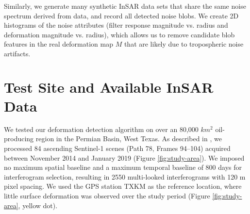 	Similarly, we generate many synthetic InSAR data sets that share the same noise spectrum derived from data, and record all detected noise blobs. We create 2D histograms of the noise attributes (filter response magnitude vs. radius and deformation magnitude vs. radius), which allows us to remove candidate blob features in the real deformation map $M$ that are likely due to tropospheric noise artifacts.
	
	\section{Test Site and Available InSAR Data}
	\label{sec:site}
	
	We tested our deformation detection algorithm on over an 80,000 $km^2$ oil-producing region in the Permian Basin, West Texas.  As described in \cite{Staniewicz2020InsarRevealsComplex}, we processed 84 ascending Sentinel-1 scenes (Path 78, Frames 94–104) acquired between November 2014 and January 2019 (Figure \ref{fig:study-area}). We imposed no maximum spatial baseline and a maximum temporal baseline of 800 days for interferogram selection, resulting in 2550 multi-looked interferograms with 120 m pixel spacing.  We used the GPS station TXKM as the reference location, where little surface deformation was observed over the study period (Figure \ref{fig:study-area}, yellow dot).
	
	
	
	
